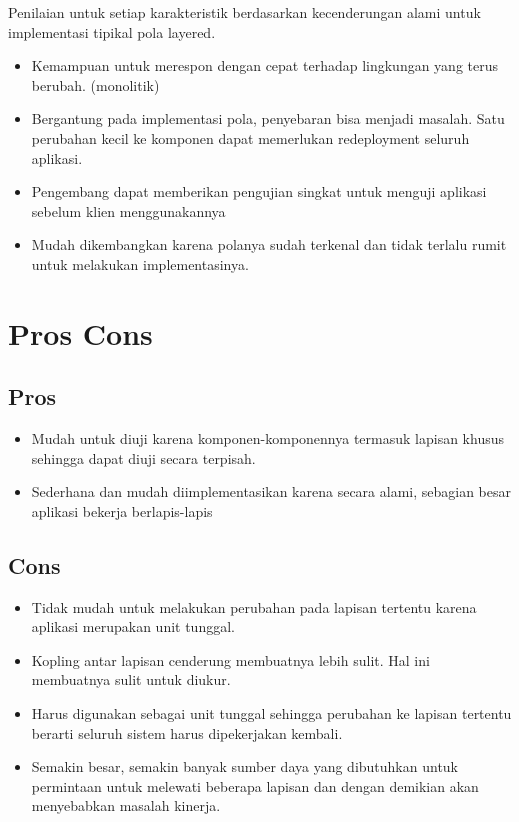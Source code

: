 \documentclass[a4paper,12pt]{article}
\begin{document}
Penilaian untuk setiap karakteristik berdasarkan kecenderungan alami untuk implementasi tipikal pola layered.

\begin{itemize}
	\item Kemampuan untuk merespon dengan cepat terhadap lingkungan yang terus berubah. (monolitik)
	\item Bergantung pada implementasi pola, penyebaran bisa menjadi masalah. Satu perubahan kecil ke komponen dapat memerlukan redeployment seluruh aplikasi.
	\item Pengembang dapat memberikan pengujian singkat untuk menguji aplikasi sebelum klien menggunakannya
	\item Mudah dikembangkan karena polanya sudah terkenal dan tidak terlalu rumit untuk melakukan implementasinya.
\end{itemize}

\section*{Pros Cons}

\subsection*{Pros}

\begin{itemize}
	\item Mudah untuk diuji karena komponen-komponennya termasuk lapisan khusus sehingga dapat diuji secara terpisah.
	\item Sederhana dan mudah diimplementasikan karena secara alami, sebagian besar aplikasi bekerja berlapis-lapis
\end{itemize}

\subsection*{Cons}

\begin{itemize}
	\item Tidak mudah untuk melakukan perubahan pada lapisan tertentu karena aplikasi merupakan unit tunggal.
	\item Kopling antar lapisan cenderung membuatnya lebih sulit. Hal ini membuatnya sulit untuk diukur.
	\item Harus digunakan sebagai unit tunggal sehingga perubahan ke lapisan tertentu berarti seluruh sistem harus dipekerjakan kembali.
	\item Semakin besar, semakin banyak sumber daya yang dibutuhkan untuk permintaan untuk melewati beberapa lapisan dan dengan demikian akan menyebabkan masalah kinerja.
\end{itemize}
\end{document}

